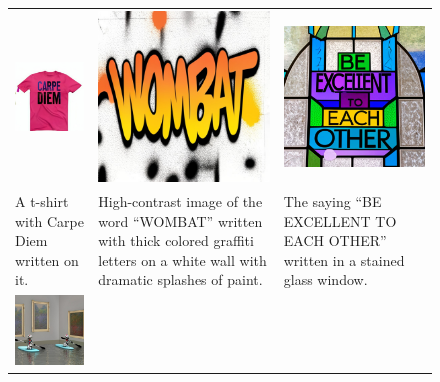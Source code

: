 \begin{figure}
  \centering
  \begin{tabular}{p{50mm}p{50mm}p{50mm}}
    \includegraphics[width=50mm]{figs/verticals/text_00716_maskgit_sresg1r1} &
    \includegraphics[width=50mm]{figs/verticals/text_01470_maskgit_sresg1r1} &
    \includegraphics[width=50mm]{figs/verticals/text_01494_maskgit_sresg1r1}
    \\
    \small A t-shirt with Carpe Diem written on it. &
    \small High-contrast image of the word ``WOMBAT'' written with thick colored graffiti letters on a white wall with dramatic splashes of paint. &
    \small The saying ``BE EXCELLENT TO EACH OTHER'' written in a stained glass window.
    \\
    \includegraphics[width=50mm]{figs/verticals/detail_00030_maskgit_sresg1r1} &

\end{tabular}
\end{figure}
